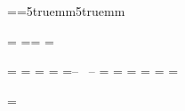 \def\dimstand{\hsize 150truemm\vsize 240truemm\hoffset=5truemm\voffset=0truemm}

\def\dimart{\hsize126truemm\vsize186truemm\hoffset16truemm\voffset=24truemm}




\interfootnoteskip=0pt
\let\note=\numberedfootnote
\everyfootnote={\eightpoint\leftskip=5truemm\rightskip5truemm}




\newcount\chstart
\chstart=\pageno
\headline={\ifnum\pageno=\chstart {\hfill} \else {\hss \tenrm --\ \folio\ --\hss}\fi}
\footline={\hfill}
\normalbaselines
\frenchspacing

\newif\ifMidFolio
\MidFoliotrue            %

\newif\ifpagetitre \pagetitretrue
\newtoks\hautpagetitre \hautpagetitre={\hfill}
\newtoks\baspagetitre \baspagetitre={\hfill}
\newtoks\auteurcourant \auteurcourant={\hfill}
\newtoks\titrecourant \titrecourant={\hfill}
\newtoks\hautpagegauche
\newtoks\hautpagedroite
\newtoks\hautpagemilieu
\hautpagemilieu={\tenrm\hfil -- \folio\ -- \hfil}
\hautpagegauche={\ifMidFolio\the\hautpagemilieu\else\tenrm\folio\hfil\the\auteurcourant\hfil\fi}
\hautpagedroite={\ifMidFolio\the\hautpagemilieu\else\hfil\the\titrecourant\hfil\tenrm\folio\fi}
\newtoks\baspagegauche \baspagegauche={\hfil}
\newtoks\baspagedroite \baspagedroite={\hfil}
\headline={\ifpagetitre\the\hautpagetitre
\else\ifodd\pageno\the\hautpagedroite\else\the\hautpagegauche\fi\fi }
\footline={\ifpagetitre\the\baspagetitre
\else\ifodd\pageno\the\baspagedroite
\else\the\baspagegauche\fi\fi \global\pagetitrefalse}

\def\nopagenumber{\headline={\hfill}\footline={\hfill}}

\def\pageblanche{\vfill\eject\pagetitretrue
\null\vfill\eject
\pagetitretrue
}


\def\hautspages#1#2{\auteurcourant={\ninepcap#1}\titrecourant={\nineit#2}\MidFoliofalse}

\ifnum\chstart=\pageno \pagetitretrue\fi







